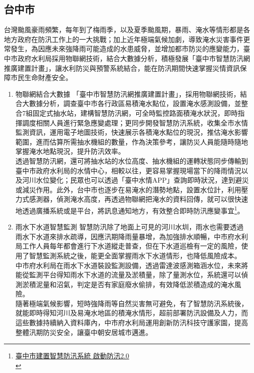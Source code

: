 \documentclass[a4paper,12pt]{article}
\begin{document}
\subsection{台中市}
\label{sec:org211c606}
台灣颱風豪雨頻繁，每年到了梅雨季，以及夏季颱風期，暴雨、淹水等情形都是各地方政府在防汛工作上的一大挑戰；加上近年極端氣候加劇，導致淹水災害事件更常發生，為因應未來強降雨可能造成的水患威脅，並增加都市防災的應變能力，臺中市政府水利局採用物聯網技術，結合大數據分析，積極發展「臺中市智慧防汛網推廣建置計畫」，讓水利防災與預警系統結合，能在防汛期間快速掌握災情資訊保障市民生命財產安全。\\
\begin{enumerate}
\item 物聯網結合大數據
\label{sec:org20329b1}
「臺中市智慧防汛網推廣建置計畫」，採用物聯網技術，結合大數據分析，調查臺中市各行政區易積淹水點位，設置淹水感測設備，並整合7組固定式抽水站，建構智慧防汛網，可全時監控路面積淹水狀況，即時指揮調度相關人員進行緊急應變處理；更同步開發智慧防汛系統，收集全市水情監測資訊，運用電子地圖技術，快速展示各積淹水點位的現況，推估淹水影響範圍，進而估算所需抽水機組的數量，作為決策參考，讓防災人員能隨時隨地掌握淹水地點現況，提升防汛效率。\\

透過智慧防汛網，還可將抽水站的水位高度、抽水機組的運轉狀態同步傳輸到臺中市政府水利局的水情中心，相較以往，更容易掌握現場當下的降雨情況以及河川水位變化；民眾也可以透過「臺中水情APP」查詢即時狀況，達到避災或減災作用。此外，台中市也逐步在易淹水的潛勢地點，設置水位計，利用壓力式感測器，偵測淹水高度，再透過物聯網把淹水的資料回傳，就可以很快速地透過廣播系統或是平台，將訊息通知地方，有效整合即時防汛應變事宜\footnote{\href{https://news.cts.com.tw/cts/general/202004/202004171997574.html}{臺中市建置智慧防汛系統 啟動防汛2.0}\\}。\\
\item 雨水下水道智慧監測
\label{sec:orge68d7b0}
智慧防汛除了地面上可見的河川水圳，雨水也需要透過雨水下水道來排水疏導，因應汛期降雨量暴增，為加強排水順暢，中市府水利局工作人員每年都會進行下水道縱走普查，但在下水道巡檢有一定的風險，使用了智慧監測系統之後，能更全面掌握雨水下水道情形，也降低風險成本。\\

中市府水利局在雨水下水道裝設監測設備，透過雷達波感測箱涵水位，未來將能從監測平台得知雨水下水道的流量及淤積量，除了量測水位，系統還可以偵測淤積泥量和沼氣，判定是否有家庭廢水偷排，有效降低淤積造成的淹水風險。\\

隨著極端氣候影響，短時強降雨等自然災害無可避免，有了智慧防汛系統後，就能即時得知河川及易淹水地區的積淹水情形，超前部署防汛設備及人力，而這些數據持續納入資料庫內，中市府水利局運用創新防汛科技守護家園，提高整體汛期防災安全，讓臺中朝安居城市邁進。\\
\end{enumerate}
\end{document}
